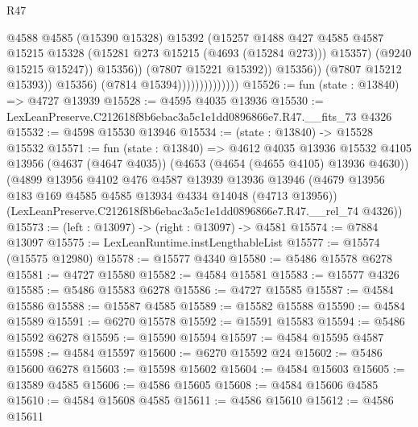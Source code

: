 \begin{lexlean}{R47}
\begin{coremodule}
                                              @4588
                                              @4585
                                              (@15390 @15328)
                                              @15392
                                              (@15257
                                                @1488
                                                @427
                                                @4585
                                                @4587
                                                @15215
                                                @15328
                                                (@15281 @273 @15215 (@4693 (@15284 @273)))
                                                @15357)
                                              (@9240 @15215 @15247))
                                            @15356))
                                        (@7807 @15221 @15392))
                                      @15356))
                                  (@7807 @15212 @15393))
                                @15356)
                              (@7814 @15394))))))))))))))
@15526 := fun (state : @13840) => @4727 @13939
@15528 := @4595 @4035 @13936
@15530 := LexLeanPreserve.C212618f8b6ebac3a5c1e1dd0896866e7.R47.__fits_73 @4326
@15532 := @4598 @15530 @13946
@15534 := (state : @13840) -> @15528 @15532
@15571 := fun (state : @13840) =>
  @4612
    @4035
    @13936
    @15532
    @4105
    @13956
    (@4637 (@4647 @4035))
    (@4653 (@4654 (@4655 @4105) @13936 @4630))
    (@4899
      @13956
      @4102
      @476
      @4587
      @13939
      @13936
      @13946
      (@4679 @13956 @183 @169 @4585 @4585 @13934 @4334 @14048 (@4713 @13956))
      (LexLeanPreserve.C212618f8b6ebac3a5c1e1dd0896866e7.R47.__rel_74 @4326))
@15573 := (left : @13097) -> (right : @13097) -> @4581
@15574 := @7884 @13097
@15575 := LexLeanRuntime.instLengthableList
@15577 := @15574 (@15575 @12980)
@15578 := @15577 @4340
@15580 := @5486 @15578 @6278
@15581 := @4727 @15580
@15582 := @4584 @15581
@15583 := @15577 @4326
@15585 := @5486 @15583 @6278
@15586 := @4727 @15585
@15587 := @4584 @15586
@15588 := @15587 @4585
@15589 := @15582 @15588
@15590 := @4584 @15589
@15591 := @6270 @15578
@15592 := @15591 @15583
@15594 := @5486 @15592 @6278
@15595 := @15590 @15594
@15597 := @4584 @15595 @4587
@15598 := @4584 @15597
@15600 := @6270 @15592 @24
@15602 := @5486 @15600 @6278
@15603 := @15598 @15602
@15604 := @4584 @15603
@15605 := @13589 @4585
@15606 := @4586 @15605
@15608 := @4584 @15606 @4585
@15610 := @4584 @15608 @4585
@15611 := @4586 @15610
@15612 := @4586 @15611

\end{coremodule}
\end{lexlean}
